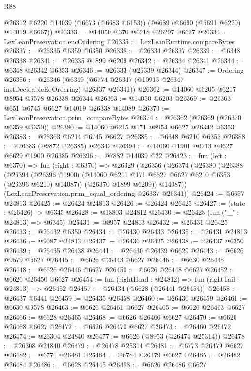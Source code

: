 \begin{lexlean}{R88}
\begin{coremodule}
    @26312
    @6220
    @14039
    (@6673 (@6683 @6153))
    (@6689 (@6690 (@6691 @6220) @14019 @6667))
@26333 := @14050 @370 @6218 @26297 @6627
@26334 := LexLeanPreservation.encOrdering
@26335 := LexLeanRuntime.compareBytes
@26337 := @26335 @6359 @6350
@26338 := @26334 @26337
@26339 := @6348 @26338
@26341 := @26335 @1899 @6209
@26342 := @26334 @26341
@26344 := @6348 @26342 @6353
@26346 := @26333 (@26339 @26344)
@26347 := Ordering
@26356 := @26346 (@6349 (@6774 @26347 (@10915 @26347 instDecidableEqOrdering) @26337 @26341))
@26362 := @14060 @6205 @6217 @8954 @9578 @26338 @26344
@26363 := @14050 @6203
@26369 := @26363 @651 @6745 @6627 @14019 @26338 @14089
@26370 := LexLeanPreservation.prim_compareBytes
@26374 := @26362 (@26369 (@26370 @6359 @6350))
@26380 := @14060 @6215 @171 @8954 @6627 @26342 @6353
@26383 := @26363 @6214 @6745 @6627
@26385 := @6348 @6210 @6353
@26388 := @26383 (@9872 @26385) @26342
@26394 := @14060 @1901 @6213 @6627 @6629 @1900 @26385
@26396 := @7882 @14039 @22
@26423 := fun (left : @6370) =>
  fun (right : @6370) =>
  @26329
    (@26356
      (@26374
        (@26380
          (@26388
            (@26394
              (@26396 @1900)
              (@14060 @6211 @171 @6627 @6627 @6210 @6353 (@26396 @6210) @14087))
            (@26370 @1899 @6209))
          @14087))
      (LexLeanPreservation.prim_equal_ordering @26337 @26341))
@26424 := @6657 @24813
@26425 := @26424 @24813
@26426 := @26424 @26425
@26427 := (state : @26426) -> @6345
@26428 := @18803 @24812
@26430 := @26428 (fun ("_" : @24813) => @6345)
@26431 := @8957 @24813
@26432 := @26431 @26425
@26433 := @26432 @6350
@26434 := @26430 @26433
@26435 := @26431 @24813
@26436 := @9087 @24813
@26437 := @26436 @26425
@26438 := @26437 @6350
@26439 := @26435 @26438
@26441 := @26430 @26439 @6629
@26443 := @6626 @9579 @6627
@26445 := @6626 @26443 @6627
@26446 := @6630 @26445
@26448 := @6626 @26446 @6627
@26450 := @6626 @26448 @6627
@26452 := @6626 @26450 @6627
@26454 := fun (rightHead : @24812) => fun (rightTail : @24813) => @26452
@26457 := @26434 (@6628 (@26441 @26454))
@26458 := @26437 @6441
@26459 := @26435 @26458
@26460 := @26430 @26459
@26461 := @6630 @9578
@26463 := @6626 @26461 @6627
@26465 := @6626 @26463 @6627
@26466 := @6628 @26465
@26468 := @6626 @26466 @6627
@26470 := @6626 @26468 @6627
@26472 := @6626 @26470 @6627
@26473 := @26460 @26472
@26474 := @26304 @24840
@26477 := @6626 (@8953 (@26474 @25314))
@26478 := @26308 @24840
@26479 := @26478 @25314
@26481 := @6773 @26479 @6627
@26482 := @6771 @26481
@26484 := @6784 @26479 @6627
@26485 := @26482 @26484
@26486 := @6628 @26445
@26488 := @6626 @26486 @6627

\end{coremodule}
\end{lexlean}
